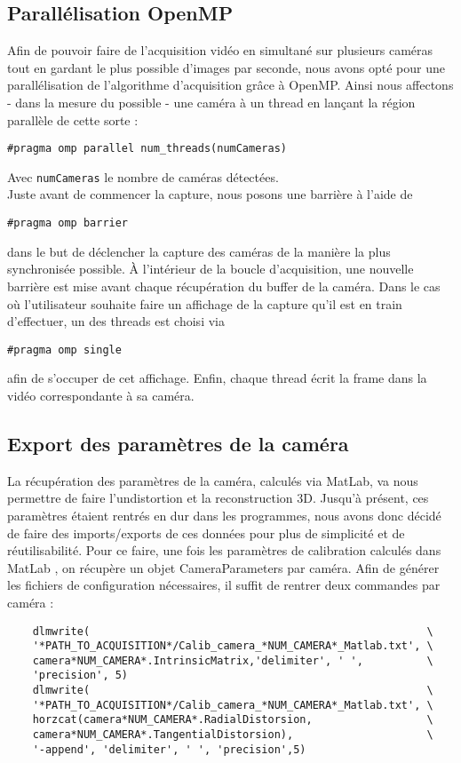 \subsection{Parallélisation OpenMP}
Afin de pouvoir faire de l'acquisition vidéo en simultané sur plusieurs caméras tout en gardant le plus possible d'images par seconde, nous avons opté pour une parallélisation de l'algorithme d'acquisition grâce à OpenMP. Ainsi nous affectons - dans la mesure du possible - une caméra à un thread en lançant la région parallèle de cette sorte :
\begin{verbatim}
#pragma omp parallel num_threads(numCameras)
\end{verbatim}
Avec \texttt{numCameras} le nombre de caméras détectées. \\
Juste avant de commencer la capture, nous posons une barrière à l'aide de 
\begin{verbatim}
#pragma omp barrier
\end{verbatim}
dans le but de déclencher la capture des caméras de la manière la plus synchronisée possible.
À l'intérieur de la boucle d'acquisition, une nouvelle barrière est mise avant chaque récupération du buffer de la caméra.
Dans le cas où l'utilisateur souhaite faire un affichage de la capture qu'il est en train d'effectuer, un des threads est choisi via
\begin{verbatim}
#pragma omp single
\end{verbatim}
afin de s'occuper de cet affichage.
Enfin, chaque thread écrit la frame dans la vidéo correspondante à sa caméra.

\subsection{Export des paramètres de la caméra}

La récupération des paramètres de la caméra, calculés via MatLab, va nous permettre de faire l'undistortion et la reconstruction 3D. Jusqu'à présent, ces paramètres étaient rentrés en dur dans les programmes, nous avons donc décidé de faire des imports/exports de ces données pour plus de simplicité et de ré\-u\-ti\-li\-sa\-bi\-li\-té.
Pour ce faire, une fois les paramètres de calibration calculés dans MatLab , on récupère un objet CameraParameters par caméra. Afin de générer les fichiers de configuration nécessaires, il suffit de rentrer deux commandes par caméra :

\begin{verbatim}
	dlmwrite( 													  \
	'*PATH_TO_ACQUISITION*/Calib_camera_*NUM_CAMERA*_Matlab.txt', \
	camera*NUM_CAMERA*.IntrinsicMatrix,'delimiter', ' ',		  \
	'precision', 5)
	dlmwrite(													  \
	'*PATH_TO_ACQUISITION*/Calib_camera_*NUM_CAMERA*_Matlab.txt', \
	horzcat(camera*NUM_CAMERA*.RadialDistorsion,				  \
	camera*NUM_CAMERA*.TangentialDistorsion),					  \
	'-append', 'delimiter', ' ', 'precision',5)
\end{verbatim}

